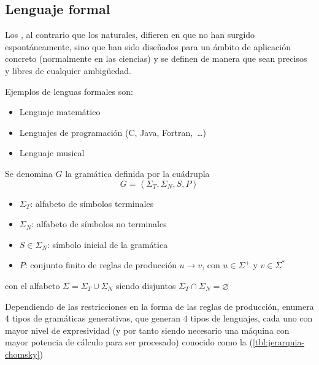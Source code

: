 \subsection{Lenguaje formal}

Los , al contrario que los naturales, difieren en que no han surgido espontáneamente, sino que han sido diseñados para un ámbito de aplicación concreto (normalmente en las ciencias) y se definen de manera que sean precisos y libres de cualquier ambigüedad.

Ejemplos de lenguas formales son:
\nopagebreak
\begin{itemize}
\item Lenguaje matemático
\item Lenguajes de programación (C, Java, Fortran,~\ldots)
\item Lenguaje musical
\end{itemize}

\begin{definition}
Se denomina  $G$ la gramática definida por la cuádrupla
\[
G = \left< \Sigma_T, \Sigma_N, S, P \right>
\]
\begin{itemize}
\item $\Sigma_T$: alfabeto de símbolos terminales
\item $\Sigma_N$: alfabeto de símbolos no terminales
\item $S \in \Sigma_N$: símbolo inicial de la gramática
\item $P$: conjunto finito de reglas de producción $u \rightarrow v$, con $u \in \Sigma^+$ y $v \in \Sigma^*$
\end{itemize}
con el alfabeto $\Sigma = \Sigma_T \cup \Sigma_N$ siendo disjuntos $\Sigma_T \cap \Sigma_N = \varnothing$
\end{definition}

Dependiendo de las restricciones en la forma de las reglas de producción, \citet{Chomsky1965} enumera 4 tipos de gramáticas generativas, que generan 4 tipos de lenguajes, cada uno con mayor nivel de expresividad (y por tanto siendo necesario una máquina con mayor potencia de cálculo para ser procesado) conocido como la  (\autoref{tbl:jerarquia-chomsky})

